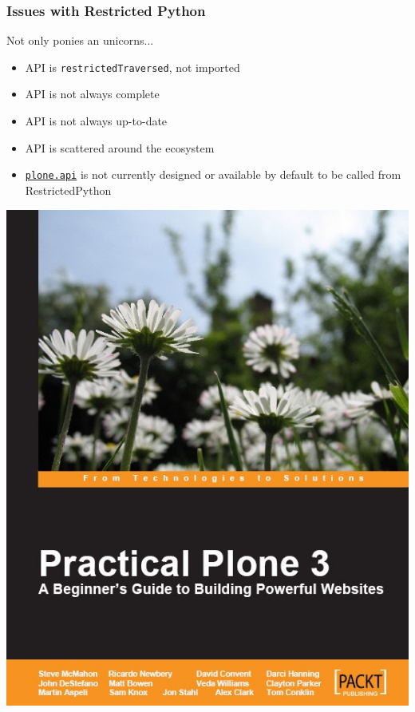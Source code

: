 \documentclass[aspectratio=43]{beamer}
\begin{document}
\begin{frame}[plain,t]
  \frametitle{Issues with Restricted Python}
  \par
  Not only ponies an unicorns...
  \par
  \vspace{0.33cm}
  \begin{itemize}[<+->]
  \setlength{\itemsep}{1em}
  \item API is \texttt{restrictedTraversed}, not imported
  \item API is not always complete
  \item API is not always up-to-date
  \item API is scattered around the ecosystem
  \item \href{https://api.plone.org/}{\texttt{plone.api}} is not currently designed or available by default to be called from RestrictedPython
  \end{itemize}
\end{frame}

\begin{frame}[plain,c]
\centering\includegraphics[trim=0 0 0 0,clip,width=0.5\paperwidth,]{images/practical-plone.jpg}
\end{frame}
\end{document}
